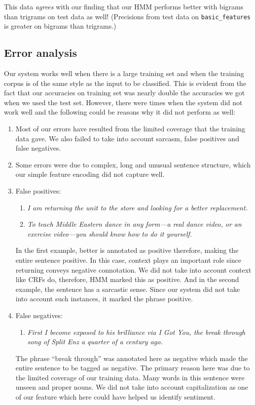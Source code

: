 \documentclass{article}
\begin{document}
This data \emph{agrees} with our finding that our HMM performs better with bigrams than trigrams on test data as well! (Precisions from test data on \texttt{basic\_features} is greater on bigrams than trigrams.)

\subsection{Error analysis}
Our system works well when there is a large training set and when the training corpus is of the same style as the input to be classified. This is evident from the fact that our accuracies on training set was nearly double the accuracies we got when we used the test set. However, there were times when the system did not work well and the following could be reasons why it did not perform as well: 
\begin{enumerate}
\item Most of our errors have resulted from the limited coverage that the training data gave. We also failed to take into account sarcasm, false positives and false negatives.
\item Some errors were due to complex, long and unusual sentence structure, which our simple feature encoding did not capture well.
\item False positives:
  \begin{enumerate}
    \item \textit{I am returning the unit to the store and looking for a \emph{better} replacement.}
    \item \textit{To teach Middle Eastern dance in any form---a real dance video, or an exercise video---you should know how to do it yourself.}
  \end{enumerate}
  In the first example, better is annotated as positive therefore, making the entire sentence positive. In this case, context plays an important role since returning conveys negative connotation. We did not take into account context like CRFs do, therefore, HMM marked this as positive. And in the second example, the sentence has a sarcastic sense. Since our system did not take into account such instances, it marked the phrase positive. 
\item False negatives:
  \begin{enumerate}
  \item \textit{First I become exposed to his brilliance via I Got You, the break through song of Split Enz a quarter of a century ago.}
  \end{enumerate}
  The phrase ``break through'' was annotated here as negative which made the entire sentence to be tagged as negative. The primary reason here was due to the limited coverage of our training data. Many words in this sentence were unseen and proper nouns. We did not take into account capitalization as one of our feature which here could have helped us identify sentiment.


\end{enumerate}
\end{document}
